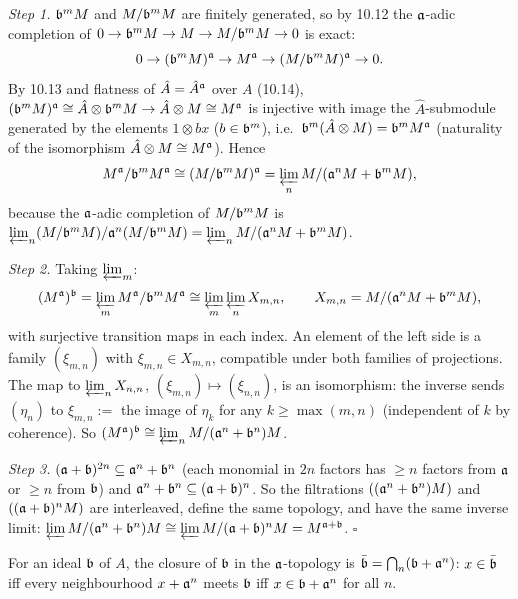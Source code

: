 \documentclass[11pt]{article}
\begin{document}
\emph{Step 1.} $\mathfrak b^mM$ and $M/\mathfrak b^mM$ are finitely generated, so by 10.12 the $\mathfrak a$-adic completion of $0\to\mathfrak b^mM\to M\to M/\mathfrak b^mM\to0$ is exact:
\[
0\to(\mathfrak b^mM)^\mathfrak a\to M^\mathfrak a\to(M/\mathfrak b^mM)^\mathfrak a\to0 .
\]
By 10.13 and flatness of $\hat A=\hat A^{\mathfrak a}$ over $A$ (10.14), $(\mathfrak b^mM)^\mathfrak a\cong\hat A\otimes\mathfrak b^mM\to\hat A\otimes M\cong M^\mathfrak a$ is injective with image the $\hat A$-submodule generated by the elements $1\otimes bx$ ($b\in\mathfrak b^m$), i.e.\ $\mathfrak b^m(\hat A\otimes M)=\mathfrak b^mM^\mathfrak a$ (naturality of the isomorphism $\hat A\otimes M\cong M^\mathfrak a$). Hence
\[
M^\mathfrak a/\mathfrak b^mM^\mathfrak a\cong(M/\mathfrak b^mM)^\mathfrak a=\varprojlim_nM/(\mathfrak a^nM+\mathfrak b^mM),
\]
because the $\mathfrak a$-adic completion of $M/\mathfrak b^mM$ is $\varprojlim_n(M/\mathfrak b^mM)/\mathfrak a^n(M/\mathfrak b^mM)=\varprojlim_nM/(\mathfrak a^nM+\mathfrak b^mM)$.

\emph{Step 2.} Taking $\varprojlim_m$:
\[
(M^\mathfrak a)^\mathfrak b=\varprojlim_mM^\mathfrak a/\mathfrak b^mM^\mathfrak a\cong\varprojlim_m\varprojlim_nX_{m,n},\qquad X_{m,n}=M/(\mathfrak a^nM+\mathfrak b^mM),
\]
with surjective transition maps in each index. An element of the left side is a family $(\xi_{m,n})$ with $\xi_{m,n}\in X_{m,n}$, compatible under both families of projections. The map to $\varprojlim_nX_{n,n}$, $(\xi_{m,n})\mapsto(\xi_{n,n})$, is an isomorphism: the inverse sends $(\eta_n)$ to $\xi_{m,n}:=$ the image of $\eta_k$ for any $k\ge\max(m,n)$ (independent of $k$ by coherence). So $(M^\mathfrak a)^\mathfrak b\cong\varprojlim_nM/(\mathfrak a^n+\mathfrak b^n)M$.

\emph{Step 3.} $(\mathfrak a+\mathfrak b)^{2n}\subseteq\mathfrak a^n+\mathfrak b^n$ (each monomial in $2n$ factors has $\ge n$ factors from $\mathfrak a$ or $\ge n$ from $\mathfrak b$) and $\mathfrak a^n+\mathfrak b^n\subseteq(\mathfrak a+\mathfrak b)^n$. So the filtrations $((\mathfrak a^n+\mathfrak b^n)M)$ and $((\mathfrak a+\mathfrak b)^nM)$ are interleaved, define the same topology, and have the same inverse limit: $\varprojlim M/(\mathfrak a^n+\mathfrak b^n)M\cong\varprojlim M/(\mathfrak a+\mathfrak b)^nM=M^{\mathfrak a+\mathfrak b}$. \hfill$\square$

\pf
For an ideal $\mathfrak b$ of $A$, the closure of $\mathfrak b$ in the $\mathfrak a$-topology is $\bar{\mathfrak b}=\bigcap_n(\mathfrak b+\mathfrak a^n)$: $x\in\bar{\mathfrak b}$ iff every neighbourhood $x+\mathfrak a^n$ meets $\mathfrak b$ iff $x\in\mathfrak b+\mathfrak a^n$ for all $n$.
\end{document}
